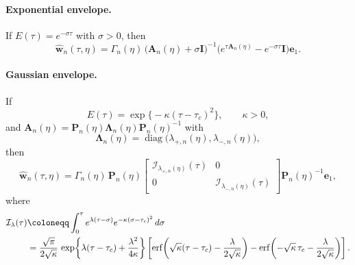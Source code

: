 \paragraph{Exponential envelope.}
If \(E(\tau)=e^{-\sigma\tau}\) with \(\sigma>0\), then
\begin{equation}
    \widehat{\mathbf{w}}_n(\tau,\eta)
    =
    \Gamma_n(\eta)\,
    \bigl(\mathbf{A}_n(\eta)+\sigma\mathbf{I}\bigr)^{-1}
    \bigl(
    e^{\tau \mathbf{A}_n(\eta)}-e^{-\sigma\tau}\mathbf{I}
    \bigr)\mathbf{e}_1.
    \label{eq:appE-exponential-envelope}
\end{equation}

\paragraph{Gaussian envelope.}
If
\begin{equation}
    E(\tau)=\exp\!\bigl\{-\kappa(\tau-\tau_c)^2\bigr\},
    \qquad
    \kappa>0,
    \label{eq:appE-gaussian-envelope}
\end{equation}
and
\(
\mathbf{A}_n(\eta)=\mathbf{P}_n(\eta)\mathbf{\Lambda}_n(\eta)\mathbf{P}_n(\eta)^{-1}
\)
with
\[
    \mathbf{\Lambda}_n(\eta)
    =
    \operatorname{diag}\bigl(\lambda_{+,n}(\eta),\lambda_{-,n}(\eta)\bigr),
\]
then
\begin{equation}
    \widehat{\mathbf{w}}_n(\tau,\eta)
    =
    \Gamma_n(\eta)\,
    \mathbf{P}_n(\eta)
    \begin{bmatrix}
        \mathcal{I}_{\lambda_{+,n}(\eta)}(\tau) & 0                                       \\
        0                                       & \mathcal{I}_{\lambda_{-,n}(\eta)}(\tau)
    \end{bmatrix}
    \mathbf{P}_n(\eta)^{-1}\mathbf{e}_1,
    \label{eq:appE-gaussian-modal-solution}
\end{equation}
where
\begin{align}
    \mathcal{I}_{\lambda}(\tau)
     & \coloneqq
    \int_0^\tau
    e^{\lambda(\tau-\sigma)}
    e^{-\kappa(\sigma-\tau_c)^2}\, d\sigma
    \notag       \\
     & =
    \frac{\sqrt{\pi}}{2\sqrt{\kappa}}\,
    \exp\!\left\{
    \lambda(\tau-\tau_c)+\frac{\lambda^2}{4\kappa}
    \right\}
    \left[
        \operatorname{erf}\!\left(
        \sqrt{\kappa}(\tau-\tau_c)-\frac{\lambda}{2\sqrt{\kappa}}
        \right)
        -
        \operatorname{erf}\!\left(
        -\sqrt{\kappa}\,\tau_c-\frac{\lambda}{2\sqrt{\kappa}}
        \right)
        \right].
    \label{eq:appE-gaussian-convolution}
\end{align}

